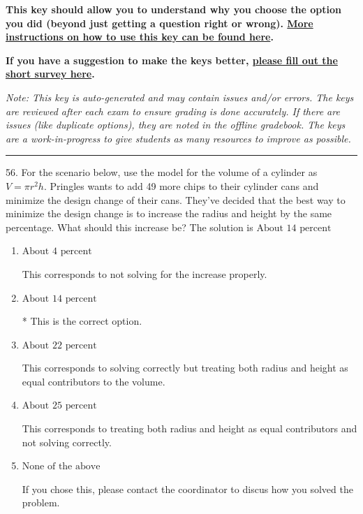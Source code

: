 \documentclass{extbook}[14pt]
\begin{document}
\textbf{This key should allow you to understand why you choose the option you did (beyond just getting a question right or wrong). \href{https://xronos.clas.ufl.edu/mac1105spring2020/courseDescriptionAndMisc/Exams/LearningFromResults}{More instructions on how to use this key can be found here}.}

\textbf{If you have a suggestion to make the keys better, \href{https://forms.gle/CZkbZmPbC9XALEE88}{please fill out the short survey here}.}

\textit{Note: This key is auto-generated and may contain issues and/or errors. The keys are reviewed after each exam to ensure grading is done accurately. If there are issues (like duplicate options), they are noted in the offline gradebook. The keys are a work-in-progress to give students as many resources to improve as possible.}

\rule{\textwidth}{0.4pt}

56. For the scenario below, use the model for the volume of a cylinder as $V = \pi r^2 h$.
Pringles wants to add 49  more chips to their cylinder cans and minimize the design change of their cans. They've decided that the best way to minimize the design change is to increase the radius and height by the same percentage. What should this increase be? 
The solution is $ \text{About } 14 \text{ percent} $ 

\begin{enumerate}[label=\Alph*.] 
\item $ \text{About } 4 \text{ percent} $ 

 This corresponds to not solving for the increase properly. 
\item $ \text{About } 14 \text{ percent} $ 

 * This is the correct option. 
\item $ \text{About } 22 \text{ percent} $ 

 This corresponds to solving correctly but treating both radius and height as equal contributors to the volume. 
\item $ \text{About } 25 \text{ percent} $ 

 This corresponds to treating both radius and height as equal contributors and not solving correctly. 
\item $ \text{None of the above} $ 

 If you chose this, please contact the coordinator to discus how you solved the problem. 
\end{enumerate} 
 
\end{document}
